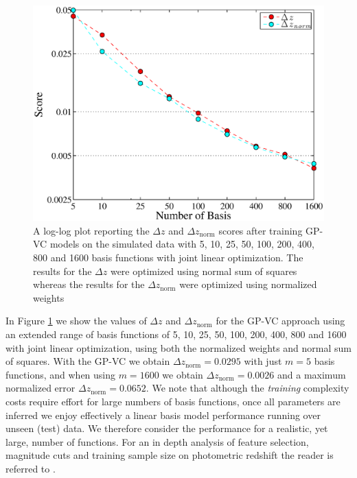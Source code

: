 \documentclass[useAMS,usenatbib,fleqn]{mn2e}
\begin{document}
\begin{figure}
       \centering
       \includegraphics[width=\columnwidth]{figures/1600}
        \caption{A log-log plot reporting the $\Delta z$ and $\Delta z_\textrm{norm}$ scores after training GP-VC models on the simulated data with 5, 10, 25, 50, 100, 200, 400, 800 and 1600 basis functions with joint linear optimization. The results for the $\Delta z$ were optimized using normal sum of squares whereas the results for the $\Delta z_\textrm{norm}$ were optimized using normalized weights}
       \label{fig-1600}
\end{figure}

In Figure \ref{fig-1600} we show the values of $\Delta z$ and $\Delta z_\textrm{norm}$ for the GP-VC approach using an extended range of basis functions of 5, 10, 25, 50, 100, 200, 400, 800 and 1600 with joint linear optimization, using both the normalized weights and normal sum of squares. With the GP-VC we obtain $\Delta z_\textrm{norm} = 0.0295$ with just $m=5$ basis functions, and when using $m=1600$ we obtain $\Delta z_\textrm{norm} = 0.0026$ and a maximum normalized error $\Delta z_\textrm{norm} = 0.0652$. We note that although the \emph{training} complexity costs require effort for large numbers of basis functions, once all parameters are inferred we enjoy effectively a linear basis model performance running over unseen (test) data. We therefore consider the performance for a realistic, yet large, number of functions. For an in depth analysis of feature selection, magnitude cuts and training sample size on photometric redshift the reader is referred to \cite{hoyle2015}.
\end{document}

